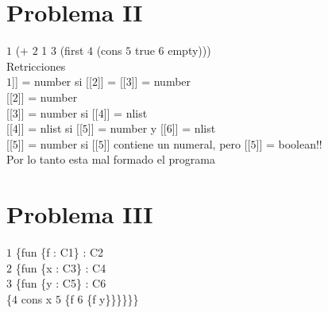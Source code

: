 \documentclass[12pt]{article}
\begin{document}
\section*{Problema II}
$\boxed{1}$ (+ $\boxed{2}$ 1 $\boxed{3}$ (first $\boxed{4}$ (cons $\boxed{5}$ true $\boxed{6}$ empty))) \\


\noindent Retricciones \\

\noindent{[[}$\boxed{1}${]]} = number si {[[}$\boxed{2}${]]} = {[[}$\boxed{3}${]]} = number \\
{[[}$\boxed{2}${]]} = number \\
{[[}$\boxed{3}${]]} = number si [[$\boxed{4}$]] = nlist \\
{[[}$\boxed{4}${]]} = nlist si [[$\boxed{5}$]] = number y [[$\boxed{6}$]] = nlist \\
{[[}$\boxed{5}${]]} = number si [[$\boxed{5}$]] contiene un numeral, pero [[$\boxed{5}$]] = boolean!! \\
Por lo tanto esta mal formado el programa

\section*{Problema III}
\noindent$\boxed{1}$ \{fun \{f : C1\} : C2 \\
  \indent$\boxed{2}$ \{fun \{x : C3\} : C4 \\
  \indent\indent$\boxed{3}$ \{fun \{y : C5\} : C6 \\
    \indent\indent\indent\{$\boxed{4}$ cons x $\boxed{5}$ \{f $\boxed{6}$ \{f y\}\}\}\}\}\} \\
\end{document}
